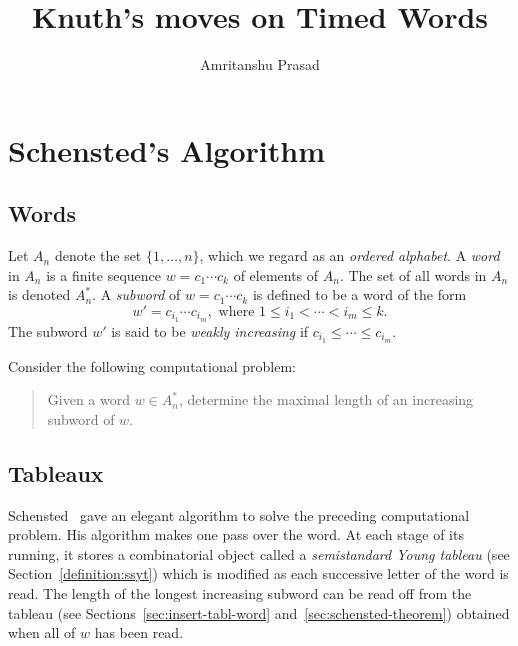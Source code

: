 \documentclass[10pt]{amsproc}
\title{Knuth's moves on Timed Words}
\author{Amritanshu Prasad}
\theoremstyle{definition}
\theoremstyle{remark}
\begin{document}
\maketitle
{}
\section{Schensted's Algorithm}
\label{sec:intro}
\subsection{Words}
\label{sec:words}
Let $A_n$ denote the set $\{1,\dotsc,n\}$, which we regard as an \emph{ordered alphabet}.
A \emph{word} in $A_n$ is a finite sequence $w=c_1\dotsb c_k$ of elements of $A_n$.
The set of all words in $A_n$ is denoted $A_n^*$.
A \emph{subword} of $w=c_1\dotsb c_k$ is defined to be a word of the form
\begin{displaymath}
  w' = c_{i_1}\dotsb c_{i_m}, \text{ where } 1\leq i_1 < \dotsb < i_m \leq k.
\end{displaymath}
The subword $w'$ is said to be \emph{weakly increasing} if $c_{i_1}\leq \dotsb \leq c_{i_m}$.

Consider the following computational problem:
\begin{quote}
  Given a word $w\in A_n^*$, determine the maximal length of an increasing subword of $w$.
\end{quote}
\subsection{Tableaux}
Schensted~\cite{schensted} gave an elegant algorithm to solve the preceding computational problem.
His algorithm makes one pass over the word.
At each stage of its running, it stores a combinatorial object called a \emph{semistandard Young tableau} (see Section~\ref{definition:ssyt}) which is modified as each successive letter of the word is read.
The length of the longest increasing subword can be read off from the tableau (see Sections~\ref{sec:insert-tabl-word} and~\ref{sec:schensted-theorem}) obtained when all of $w$ has been read.
\end{document}
